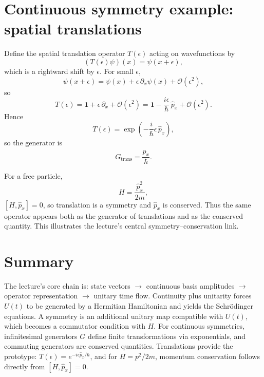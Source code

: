 \section{Continuous symmetry example: spatial translations}

Define the spatial translation operator \(T(\epsilon)\) acting on wavefunctions by
\begin{equation}
(T(\epsilon)\psi)(x)=\psi(x+\epsilon),
\end{equation}
which is a rightward shift by \(\epsilon\). For small \(\epsilon\),
\begin{equation}
\psi(x+\epsilon)=\psi(x)+\epsilon\,\partial_x\psi(x)+\mathcal O(\epsilon^2),
\end{equation}
so
\begin{equation}
T(\epsilon)=\mathbf1+\epsilon\,\partial_x+\mathcal O(\epsilon^2)
=\mathbf1-\frac{i\epsilon}{\hbar}\,\hat p_x+\mathcal O(\epsilon^2).
\end{equation}
Hence
\begin{equation}
T(\epsilon)=\exp\!\left(-\frac{i}{\hbar}\epsilon\,\hat p_x\right),
\end{equation}
so the generator is
\begin{equation}
G_{\text{trans}}=\frac{\hat p_x}{\hbar}.
\end{equation}

For a free particle,
\begin{equation}
H=\frac{\hat p_x^2}{2m},
\end{equation}
\([H,\hat p_x]=0\), so translation is a symmetry and \(\hat p_x\) is conserved. Thus the same operator appears both as the generator of translations and as the conserved quantity. This illustrates the lecture's central symmetry--conservation link.

\section{Summary}

The lecture’s core chain is:  
state vectors \(\to\) continuous basis amplitudes \(\to\) operator representation \(\to\) unitary time flow.  
Continuity plus unitarity forces \(U(t)\) to be generated by a Hermitian Hamiltonian and yields the Schrödinger equations.  
A symmetry is an additional unitary map compatible with \(U(t)\), which becomes a commutator condition with \(H\).  
For continuous symmetries, infinitesimal generators \(G\) define finite transformations via exponentials, and commuting generators are conserved quantities.  
Translations provide the prototype: \(T(\epsilon)=e^{-i\epsilon \hat p_x/\hbar}\), and for \(H=p^2/2m\), momentum conservation follows directly from \([H,\hat p_x]=0\).
